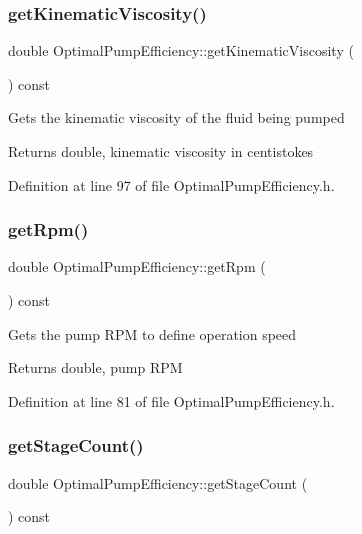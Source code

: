 \subsubsection{\texorpdfstring{get\+Kinematic\+Viscosity()}{getKinematicViscosity()}}
{\footnotesize\ttfamily double Optimal\+Pump\+Efficiency\+::get\+Kinematic\+Viscosity (\begin{DoxyParamCaption}{ }\end{DoxyParamCaption}) const\hspace{0.3cm}{\ttfamily [inline]}}

Gets the kinematic viscosity of the fluid being pumped \begin{DoxyReturn}{Returns}
double, kinematic viscosity in centistokes 
\end{DoxyReturn}


Definition at line 97 of file Optimal\+Pump\+Efficiency.\+h.

\mbox{\label{class_optimal_pump_efficiency_a58e8a430ced612e0518abd07fb30b085}} 
\subsubsection{\texorpdfstring{get\+Rpm()}{getRpm()}}
{\footnotesize\ttfamily double Optimal\+Pump\+Efficiency\+::get\+Rpm (\begin{DoxyParamCaption}{ }\end{DoxyParamCaption}) const\hspace{0.3cm}{\ttfamily [inline]}}

Gets the pump R\+PM to define operation speed \begin{DoxyReturn}{Returns}
double, pump R\+PM 
\end{DoxyReturn}


Definition at line 81 of file Optimal\+Pump\+Efficiency.\+h.

\mbox{\label{class_optimal_pump_efficiency_aac0c1a4a6492bf00b245c2a61d100eaa}} 
\subsubsection{\texorpdfstring{get\+Stage\+Count()}{getStageCount()}}
{\footnotesize\ttfamily double Optimal\+Pump\+Efficiency\+::get\+Stage\+Count (\begin{DoxyParamCaption}{ }\end{DoxyParamCaption}) const\hspace{0.3cm}{\ttfamily [inline]}}

